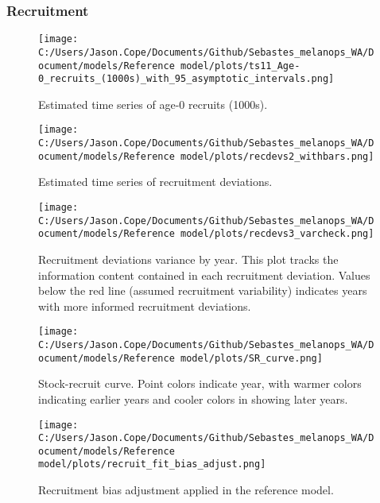 \documentclass[11pt,
  letterpaper,
]{article}
\begin{document}
\hypertarget{recruitment-1}{%
\subsubsection{Recruitment}\label{recruitment-1}}

\begin{figure}
{\centering
\texttt{[image: C:/Users/Jason.Cope/Documents/Github/Sebastes\_melanops\_WA/Document/models/Reference model/plots/ts11\_Age-0\_recruits\_(1000s)\_with\_95\_asymptotic\_intervals.png]}
}
\caption{Estimated time series of age-0 recruits (1000s).\label{fig:recruits}}
\end{figure}

\pagebreak

\begin{figure}
{\centering
\texttt{[image: C:/Users/Jason.Cope/Documents/Github/Sebastes\_melanops\_WA/Document/models/Reference model/plots/recdevs2\_withbars.png]}
}
\caption{Estimated time series of recruitment deviations.\label{fig:rec-devs}}
\end{figure}

\pagebreak

\begin{figure}
{\centering
\texttt{[image: C:/Users/Jason.Cope/Documents/Github/Sebastes\_melanops\_WA/Document/models/Reference model/plots/recdevs3\_varcheck.png]}
}
\caption{Recruitment deviations variance by year. This plot tracks the information content contained in each recruitment deviation. Values below the red line (assumed recruitment variability) indicates years with more informed recruitment deviations.\label{fig:rec-devs-sigmas}}
\end{figure}

\pagebreak

\begin{figure}
{\centering
\texttt{[image: C:/Users/Jason.Cope/Documents/Github/Sebastes\_melanops\_WA/Document/models/Reference model/plots/SR\_curve.png]}
}
\caption{Stock-recruit curve. Point colors indicate year, with warmer colors indicating earlier years and cooler colors in showing later years.\label{fig:bh-curve}}
\end{figure}

\pagebreak

\begin{figure}
{\centering
\texttt{[image: C:/Users/Jason.Cope/Documents/Github/Sebastes\_melanops\_WA/Document/models/Reference model/plots/recruit\_fit\_bias\_adjust.png]}
}
\caption{Recruitment bias adjustment applied in the reference model.\label{fig:bias-adj}}
\end{figure}
\end{document}
